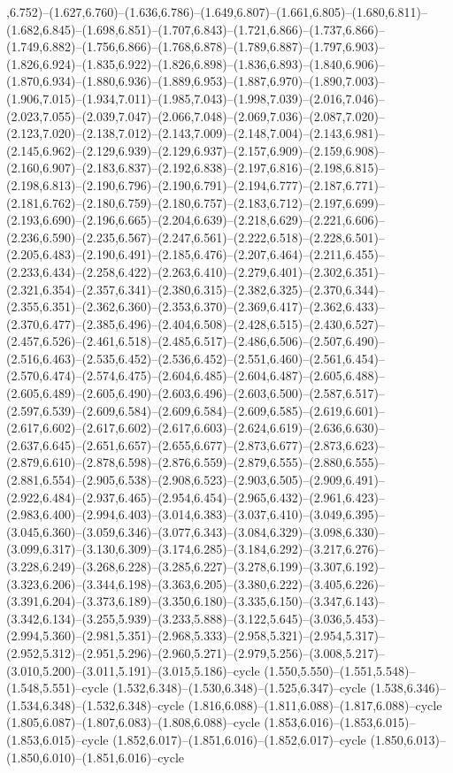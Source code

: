 ,6.752)--(1.627,6.760)--(1.636,6.786)--(1.649,6.807)--(1.661,6.805)--(1.680,6.811)--(1.682,6.845)--(1.698,6.851)--(1.707,6.843)--(1.721,6.866)--(1.737,6.866)--(1.749,6.882)--(1.756,6.866)--(1.768,6.878)--(1.789,6.887)--(1.797,6.903)--(1.826,6.924)--(1.835,6.922)--(1.826,6.898)--(1.836,6.893)--(1.840,6.906)--(1.870,6.934)--(1.880,6.936)--(1.889,6.953)--(1.887,6.970)--(1.890,7.003)--(1.906,7.015)--(1.934,7.011)--(1.985,7.043)--(1.998,7.039)--(2.016,7.046)--(2.023,7.055)--(2.039,7.047)--(2.066,7.048)--(2.069,7.036)--(2.087,7.020)--(2.123,7.020)--(2.138,7.012)--(2.143,7.009)--(2.148,7.004)--(2.143,6.981)--(2.145,6.962)--(2.129,6.939)--(2.129,6.937)--(2.157,6.909)--(2.159,6.908)--(2.160,6.907)--(2.183,6.837)--(2.192,6.838)--(2.197,6.816)--(2.198,6.815)--(2.198,6.813)--(2.190,6.796)--(2.190,6.791)--(2.194,6.777)--(2.187,6.771)--(2.181,6.762)--(2.180,6.759)--(2.180,6.757)--(2.183,6.712)--(2.197,6.699)--(2.193,6.690)--(2.196,6.665)--(2.204,6.639)--(2.218,6.629)--(2.221,6.606)--(2.236,6.590)--(2.235,6.567)--(2.247,6.561)--(2.222,6.518)--(2.228,6.501)--(2.205,6.483)--(2.190,6.491)--(2.185,6.476)--(2.207,6.464)--(2.211,6.455)--(2.233,6.434)--(2.258,6.422)--(2.263,6.410)--(2.279,6.401)--(2.302,6.351)--(2.321,6.354)--(2.357,6.341)--(2.380,6.315)--(2.382,6.325)--(2.370,6.344)--(2.355,6.351)--(2.362,6.360)--(2.353,6.370)--(2.369,6.417)--(2.362,6.433)--(2.370,6.477)--(2.385,6.496)--(2.404,6.508)--(2.428,6.515)--(2.430,6.527)--(2.457,6.526)--(2.461,6.518)--(2.485,6.517)--(2.486,6.506)--(2.507,6.490)--(2.516,6.463)--(2.535,6.452)--(2.536,6.452)--(2.551,6.460)--(2.561,6.454)--(2.570,6.474)--(2.574,6.475)--(2.604,6.485)--(2.604,6.487)--(2.605,6.488)--(2.605,6.489)--(2.605,6.490)--(2.603,6.496)--(2.603,6.500)--(2.587,6.517)--(2.597,6.539)--(2.609,6.584)--(2.609,6.584)--(2.609,6.585)--(2.619,6.601)--(2.617,6.602)--(2.617,6.602)--(2.617,6.603)--(2.624,6.619)--(2.636,6.630)--(2.637,6.645)--(2.651,6.657)--(2.655,6.677)--(2.873,6.677)--(2.873,6.623)--(2.879,6.610)--(2.878,6.598)--(2.876,6.559)--(2.879,6.555)--(2.880,6.555)--(2.881,6.554)--(2.905,6.538)--(2.908,6.523)--(2.903,6.505)--(2.909,6.491)--(2.922,6.484)--(2.937,6.465)--(2.954,6.454)--(2.965,6.432)--(2.961,6.423)--(2.983,6.400)--(2.994,6.403)--(3.014,6.383)--(3.037,6.410)--(3.049,6.395)--(3.045,6.360)--(3.059,6.346)--(3.077,6.343)--(3.084,6.329)--(3.098,6.330)--(3.099,6.317)--(3.130,6.309)--(3.174,6.285)--(3.184,6.292)--(3.217,6.276)--(3.228,6.249)--(3.268,6.228)--(3.285,6.227)--(3.278,6.199)--(3.307,6.192)--(3.323,6.206)--(3.344,6.198)--(3.363,6.205)--(3.380,6.222)--(3.405,6.226)--(3.391,6.204)--(3.373,6.189)--(3.350,6.180)--(3.335,6.150)--(3.347,6.143)--(3.342,6.134)--(3.255,5.939)--(3.233,5.888)--(3.122,5.645)--(3.036,5.453)--(2.994,5.360)--(2.981,5.351)--(2.968,5.333)--(2.958,5.321)--(2.954,5.317)--(2.952,5.312)--(2.951,5.296)--(2.960,5.271)--(2.979,5.256)--(3.008,5.217)--(3.010,5.200)--(3.011,5.191)--(3.015,5.186)--cycle (1.550,5.550)--(1.551,5.548)--(1.548,5.551)--cycle (1.532,6.348)--(1.530,6.348)--(1.525,6.347)--cycle (1.538,6.346)--(1.534,6.348)--(1.532,6.348)--cycle (1.816,6.088)--(1.811,6.088)--(1.817,6.088)--cycle (1.805,6.087)--(1.807,6.083)--(1.808,6.088)--cycle (1.853,6.016)--(1.853,6.015)--(1.853,6.015)--cycle (1.852,6.017)--(1.851,6.016)--(1.852,6.017)--cycle (1.850,6.013)--(1.850,6.010)--(1.851,6.016)--cycle 